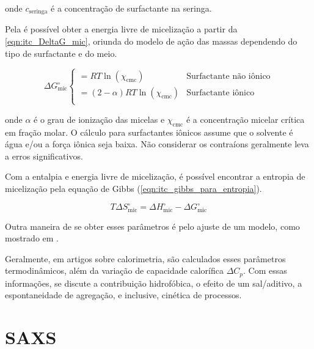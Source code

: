 		\noindent onde \(c_{\mathrm{seringa}}\) é a concentração de surfactante na seringa.
		
		Pela \cmc{} é possível obter a energia livre de micelização a partir da \autoref{eqn:itc_DeltaG_mic}, oriunda do modelo de ação das massas\cite{Loh2016} dependendo do tipo de surfactante e do meio.
		
		\begin{equation}
			\Delta G_{\textrm{mic}}^\circ
			\begin{cases}
			= RT\ln(\chi_{\textrm{cmc}})      & \textrm{Surfactante não iônico}      \\
			= (2-\alpha)RT\ln(\chi_{\textrm{cmc}}) & \textrm{Surfactante iônico}					\\
			\end{cases}
			\label{eqn:itc_DeltaG_mic}
		\end{equation} 
		
		\noindent onde \(\alpha\) é o grau de ionização das micelas e \(\chi_{\mathrm{cmc}}\) é a concentração micelar crítica em fração molar. O cálculo para surfactantes iônicos assume que o solvente é água e/ou a força iônica seja baixa. Não considerar os contraíons geralmente leva a erros significativos.\cite{Bouchemal2010a}
		
		Com a entalpia e energia livre de micelização, é possível encontrar a entropia de micelização pela equação de Gibbs (\autoref{eqn:itc_gibbs_para_entropia}).
		
		\begin{equation}
			T\Delta S^\circ_{\textrm{mic}} = \Delta H^\circ_{\textrm{mic}} - \Delta G^\circ_{\textrm{mic}}
			\label{eqn:itc_gibbs_para_entropia}
		\end{equation}
		
		Outra maneira de se obter esses parâmetros é pelo ajuste de um modelo, como mostrado em \citeauthor{Sarac2017a}.
		
		Geralmente, em artigos sobre calorimetria, são calculados esses parâmetros termodinâmicos, além da variação de capacidade calorífica \(\Delta C_p\). Com essas informações, se discute a contribuição hidrofóbica\cite{Sarac2017a, Kfouri2019}, o efeito de um sal/aditivo\cite{Sarac2009, Liu2011a, Ito2016}, a espontaneidade de agregação\cite{Ito2016}, e inclusive, cinética de processos.\cite{Kfouri2019,Lof2007a}
		
	\chapter{SAXS}  
